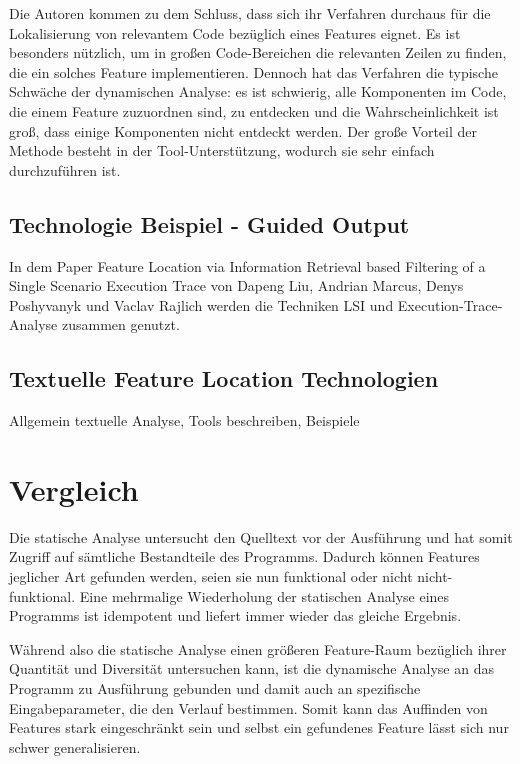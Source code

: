 \documentclass[runningheads,a4paper]{llncs}
\begin{document}
Die Autoren kommen zu dem Schluss, dass sich ihr Verfahren durchaus für die Lokalisierung von relevantem Code bezüglich eines Features eignet. Es ist besonders nützlich, um in großen Code-Bereichen die relevanten Zeilen zu finden, die ein solches Feature implementieren. Dennoch hat das Verfahren die typische Schwäche der dynamischen Analyse: es ist schwierig, alle Komponenten im Code, die einem Feature zuzuordnen sind, zu entdecken und die Wahrscheinlichkeit ist groß, dass einige Komponenten nicht entdeckt werden. Der große Vorteil der Methode besteht in der Tool-Unterstützung, wodurch sie sehr einfach durchzuführen ist. 

\subsection*{Technologie Beispiel - Guided Output}

In dem Paper Feature Location via Information Retrieval based Filtering of a Single Scenario Execution Trace von Dapeng Liu, Andrian Marcus, Denys Poshyvanyk und Vaclav Rajlich werden die Techniken LSI und Execution-Trace-Analyse zusammen genutzt. 

\subsection{Textuelle Feature Location Technologien}

Allgemein textuelle Analyse, Tools beschreiben, Beispiele

\section{Vergleich}

Die statische Analyse untersucht den Quelltext vor der Ausführung und hat somit Zugriff auf sämtliche Bestandteile des Programms. Dadurch können Features jeglicher Art gefunden werden, seien sie nun funktional oder nicht nicht-funktional. Eine mehrmalige Wiederholung der statischen Analyse eines
Programms ist idempotent und liefert immer wieder das gleiche Ergebnis.

Während also die statische Analyse einen größeren Feature-Raum bezüglich ihrer Quantität und Diversität untersuchen kann, ist die dynamische
Analyse an das Programm zu Ausführung gebunden und damit auch an spezifische Eingabeparameter, die den Verlauf bestimmen. Somit kann das Auffinden von Features stark eingeschränkt sein und selbst ein gefundenes Feature lässt sich nur schwer generalisieren.
\end{document}
